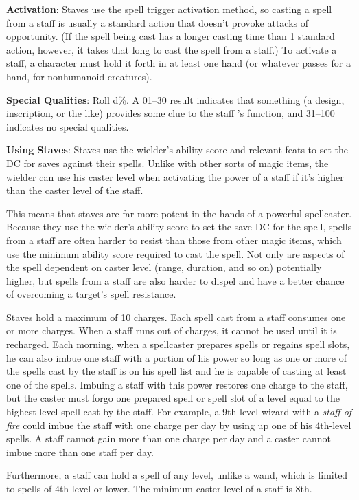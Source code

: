 \textbf{Activation}: Staves use the spell trigger activation method, so casting a spell from a staff is usually a standard action that doesn't provoke attacks of opportunity. (If the spell being cast has a longer casting time than 1 standard action, however, it takes that long to cast the spell from a staff.) To activate a staff, a character must hold it forth in at least one hand (or whatever passes for a hand, for nonhumanoid creatures).
				
\textbf{Special Qualities}: Roll d\%. A 01--30 result indicates that something (a design, inscription, or the like) provides some clue to the staff 's function, and 31--100 indicates no special qualities.
				
\textbf{Using Staves}: Staves use the wielder's ability score and relevant feats to set the DC for saves against their spells. Unlike with other sorts of magic items, the wielder can use his caster level when activating the power of a staff if it's higher than the caster level of the staff. 
				
This means that staves are far more potent in the hands of a powerful spellcaster. Because they use the wielder's ability score to set the save DC for the spell, spells from a staff are often harder to resist than those from other magic items, which use the minimum ability score required to cast the spell. Not only are aspects of the spell dependent on caster level (range, duration, and so on) potentially higher, but spells from a staff are also harder to dispel and have a better chance of overcoming a target's spell resistance.
				
Staves hold a maximum of 10 charges. Each spell cast from a staff consumes one or more charges. When a staff runs out of charges, it cannot be used until it is recharged. Each morning, when a spellcaster prepares spells or regains spell slots, he can also imbue one staff with a portion of his power so long as one or more of the spells cast by the staff is on his spell list and he is capable of casting at least one of the spells. Imbuing a staff with this power restores one charge to the staff, but the caster must forgo one prepared spell or spell slot of a level equal to the highest-level spell cast by the staff. For example, a 9th-level wizard with a \textit{staff of fire} could imbue the staff with one charge per day by using up one of his 4th-level spells. A staff cannot gain more than one charge per day and a caster cannot imbue more than one staff per day.
				
Furthermore, a staff can hold a spell of any level, unlike a wand, which is limited to spells of 4th level or lower. The minimum caster level of a staff is 8th.
				
